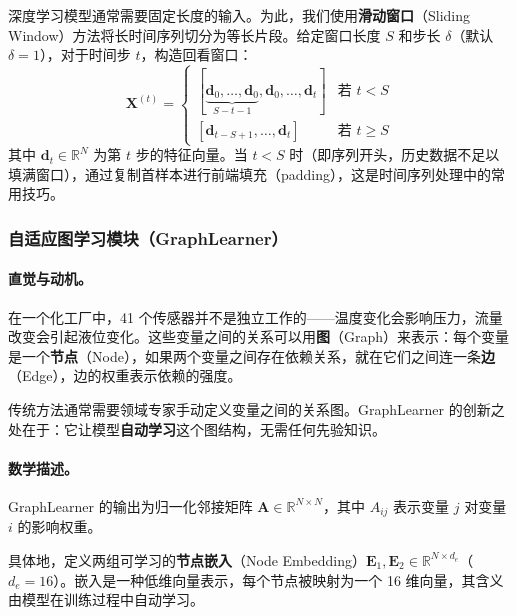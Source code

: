 \documentclass[UTF8]{ctexart}
\begin{document}
深度学习模型通常需要固定长度的输入。为此，我们使用\textbf{滑动窗口}（Sliding Window）方法将长时间序列切分为等长片段。给定窗口长度 $S$ 和步长 $\delta$（默认 $\delta=1$），对于时间步 $t$，构造回看窗口：
\begin{equation}
    \mathbf{X}^{(t)} =
    \begin{cases}
        [\underbrace{\mathbf{d}_0, \ldots, \mathbf{d}_0}_{S-t-1}, \mathbf{d}_0, \ldots, \mathbf{d}_t] & \text{若 } t < S \\[6pt]
        [\mathbf{d}_{t-S+1}, \ldots, \mathbf{d}_t] & \text{若 } t \geq S
    \end{cases}
\end{equation}
其中 $\mathbf{d}_t \in \mathbb{R}^N$ 为第 $t$ 步的特征向量。当 $t < S$ 时（即序列开头，历史数据不足以填满窗口），通过复制首样本进行前端填充（padding），这是时间序列处理中的常用技巧。

\subsubsection{自适应图学习模块（GraphLearner）}

\paragraph{直觉与动机。}

在一个化工厂中，41 个传感器并不是独立工作的——温度变化会影响压力，流量改变会引起液位变化。这些变量之间的关系可以用\textbf{图}（Graph）来表示：每个变量是一个\textbf{节点}（Node），如果两个变量之间存在依赖关系，就在它们之间连一条\textbf{边}（Edge），边的权重表示依赖的强度。

传统方法通常需要领域专家手动定义变量之间的关系图。GraphLearner 的创新之处在于：它让模型\textbf{自动学习}这个图结构，无需任何先验知识。

\paragraph{数学描述。}

GraphLearner 的输出为归一化邻接矩阵 $\mathbf{A} \in \mathbb{R}^{N \times N}$，其中 $A_{ij}$ 表示变量 $j$ 对变量 $i$ 的影响权重。

具体地，定义两组可学习的\textbf{节点嵌入}（Node Embedding）$\mathbf{E}_1, \mathbf{E}_2 \in \mathbb{R}^{N \times d_e}$（$d_e=16$）。嵌入是一种低维向量表示，每个节点被映射为一个 16 维向量，其含义由模型在训练过程中自动学习。
\end{document}
